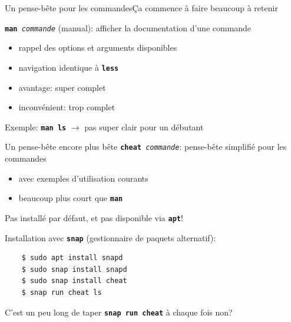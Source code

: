 \documentclass[
aspectratio=169 %
]{beamer}
\newcommand{\cmd}[1]{\texttt{\textbf{#1}}}
\newcommand{\args}[1]{\texttt{\textit{#1}}}
\begin{document}
\begin{frame}{Un pense-bête pour les commandes}{Ça commence à faire beaucoup à
        retenir}

    \cmd{man}\args{ commande} (manual): afficher la documentation d'une
    commande
    \begin{itemize}
        \item rappel des options et arguments disponibles
        \item navigation identique à \cmd{less}
        \item avantage: super complet
        \item inconvénient: trop complet
    \end{itemize}

    \bigskip
    Exemple: \cmd{man ls} \(\rightarrow\) pas super clair pour un débutant

\end{frame}

\begin{frame}[fragile]{Un pense-bête encore plus bête}
    \cmd{cheat}\args{ commande}: pense-bête simplifié pour les commandes
    \begin{itemize}
        \item avec exemples d'utilisation courants
        \item beaucoup plus court que \cmd{man}
    \end{itemize}

    \bigskip
    Pas installé par défaut, et \alert{pas disponible via \cmd{apt}!}

    \smallskip
    Installation avec \cmd{snap} (gestionnaire de paquets alternatif):
    \begin{lstlisting}
    $ sudo apt install snapd
    $ sudo snap install snapd
    $ sudo snap install cheat
    $ snap run cheat ls
    \end{lstlisting}

    \alert{C'est un peu long de taper \cmd{snap run cheat} à chaque fois non?}
\end{frame}
\end{document}
